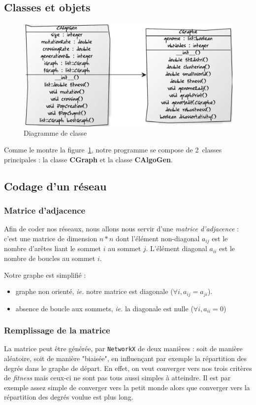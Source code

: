 \subsection{Classes et objets}
\begin{figure}
\includegraphics[width=\linewidth]{diagramme}
\caption{Diagramme de classe}
\label{diag}
\end{figure}
Comme le montre la figure~\ref{diag}, notre programme se compose de 2~classes principales : la classe \textbf{CGraph} et la classe \textbf{CAlgoGen}.

\subsection{Codage d'un réseau}
\subsubsection{Matrice d'adjacence}
Afin de coder nos réseaux, nous allons nous servir d'une \textit{matrice d'adjacence} : c'est une matrice de dimension $n * n$ dont l'élément non-diagonal $a_{ij}$ est le nombre d'arêtes liant le sommet $i$ au sommet $j$. L'élément diagonal $a_{ii}$ est le nombre de boucles au sommet $i$.

Notre graphe est simplifié :
\begin{itemize}
 \item graphe non orienté, \textit{ie.} notre matrice est diagonale ($\forall i, a_{ij}=a_{ji}$).
 \item absence de boucle aux sommets, \textit{ie.} la diagonale est nulle ($\forall i, a_{ii}=0$)
\end{itemize}

\subsubsection{Remplissage de la matrice}
La matrice peut être générée, par \verb?NetworkX? de deux manières : soit de manière aléatoire, soit de manière "biaisée", en influençant par exemple la répartition des degrés dans le graphe de départ. En effet, on veut converger vers nos trois critères de \textit{fitness} mais ceux-ci ne sont pas tous aussi simples à atteindre. Il est par exemple assez simple de converger vers la petit monde alors que converger vers la répartition des degrés voulue est plus long.

